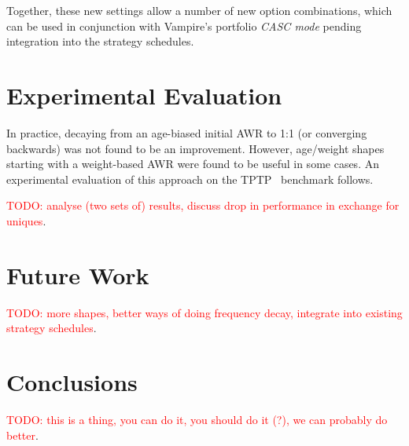 \documentclass{llncs}
\newcommand{\todo}[1]{\textcolor{red}{TODO: #1}}
\begin{document}
Together, these new settings allow a number of new option combinations, which can be used in conjunction with Vampire's portfolio \emph{CASC mode} pending integration into the strategy schedules.

\section{Experimental Evaluation}
In practice, decaying from an age-biased initial AWR to 1:1 (or converging backwards) was not found to be an improvement.
However, age/weight shapes starting with a weight-based AWR were found to be useful in some cases.
An experimental evaluation of this approach on the TPTP~\cite{tptp} benchmark follows.

\todo{analyse (two sets of) results, discuss drop in performance in exchange for uniques}.

\section{Future Work}
\todo{more shapes, better ways of doing frequency decay, integrate into existing strategy schedules}.

\section{Conclusions}
\todo{this is a thing, you can do it, you should do it (?), we can probably do better}.



\end{document}
